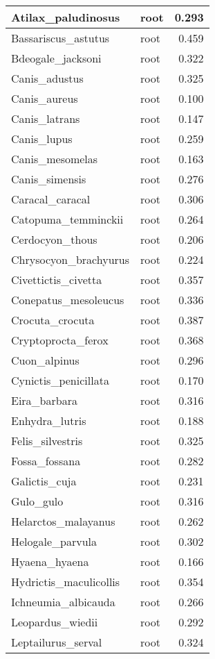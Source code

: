 \begin{table}
\begin{tabular}[t]{l|l|r}
\hline
Atilax\_paludinosus & root & 0.293\\
\hline
Bassariscus\_astutus & root & 0.459\\
\hline
Bdeogale\_jacksoni & root & 0.322\\
\hline
Canis\_adustus & root & 0.325\\
\hline
Canis\_aureus & root & 0.100\\
\hline
Canis\_latrans & root & 0.147\\
\hline
Canis\_lupus & root & 0.259\\
\hline
Canis\_mesomelas & root & 0.163\\
\hline
Canis\_simensis & root & 0.276\\
\hline
Caracal\_caracal & root & 0.306\\
\hline
Catopuma\_temminckii & root & 0.264\\
\hline
Cerdocyon\_thous & root & 0.206\\
\hline
Chrysocyon\_brachyurus & root & 0.224\\
\hline
Civettictis\_civetta & root & 0.357\\
\hline
Conepatus\_mesoleucus & root & 0.336\\
\hline
Crocuta\_crocuta & root & 0.387\\
\hline
Cryptoprocta\_ferox & root & 0.368\\
\hline
Cuon\_alpinus & root & 0.296\\
\hline
Cynictis\_penicillata & root & 0.170\\
\hline
Eira\_barbara & root & 0.316\\
\hline
Enhydra\_lutris & root & 0.188\\
\hline
Felis\_silvestris & root & 0.325\\
\hline
Fossa\_fossana & root & 0.282\\
\hline
Galictis\_cuja & root & 0.231\\
\hline
Gulo\_gulo & root & 0.316\\
\hline
Helarctos\_malayanus & root & 0.262\\
\hline
Helogale\_parvula & root & 0.302\\
\hline
Hyaena\_hyaena & root & 0.166\\
\hline
Hydrictis\_maculicollis & root & 0.354\\
\hline
Ichneumia\_albicauda & root & 0.266\\
\hline
Leopardus\_wiedii & root & 0.292\\
\hline
Leptailurus\_serval & root & 0.324\\

\end{tabular}
\end{table}

